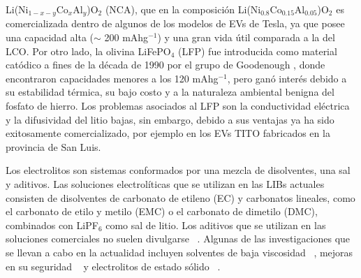 Li(Ni$_{1-x-y}$Co$_x$Al$_y$)O$_2$ (NCA), que en la composición 
Li(Ni$_{0.8}$Co$_{0.15}$Al$_{0.05}$)O$_2$ \cite{chen2004} es comercializada 
dentro de algunos de los modelos de EVs de Tesla, ya que posee una capacidad alta ($\sim$ 200 mAhg$^{-1}$) y una gran vida útil comparada a la del LCO. Por otro lado, la olivina 
LiFePO$_4$ (LFP) fue introducida como material catódico a fines de la década 
de 1990 por el grupo de Goodenough \cite{padhi1997}, donde encontraron capacidades
menores a los 120 mAhg$^{-1}$, pero ganó interés debido a su estabilidad térmica, su bajo costo y a la 
naturaleza ambiental benigna del fosfato de hierro. Los problemas asociados al LFP son la
conductividad eléctrica y la difusividad del litio bajas, sin embargo, debido
a sus ventajas ya ha sido exitosamente comercializado, por ejemplo en los EVs 
TITO fabricados en la provincia de San Luis.

Los electrolitos son sistemas conformados por una mezcla de disolventes, una 
sal y aditivos. Las soluciones electrolíticas que se utilizan en las LIBs actuales 
consisten de disolventes de carbonato de etileno (EC) y carbonatos lineales, como
el carbonato de etilo y metilo (EMC) o el carbonato de dimetilo (DMC), combinados 
con LiPF$_6$ como sal de litio. Los aditivos que se utilizan en las soluciones 
comerciales no suelen divulgarse ~\cite{schipper2016}. Algunas de las 
investigaciones que se llevan a cabo en la actualidad incluyen solventes de
baja viscosidad ~\cite{logan2020}, mejoras en su seguridad ~\cite{wang2019} 
y electrolitos de estado sólido ~\cite{zheng2018}.

